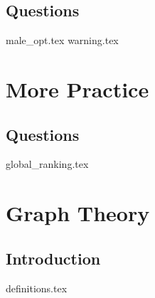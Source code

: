 \documentclass{exam}
\begin{document}
\subsection{Questions}
\begin{questions}
{male_opt.tex}
{warning.tex}
\end{questions}

\section{More Practice}
\subsection{Questions}
\begin{questions}
{global_ranking.tex}
\end{questions}

\section{Graph Theory}
\subsection{Introduction}
\begin{questions}
{definitions.tex}
\end{questions}


\end{document}
